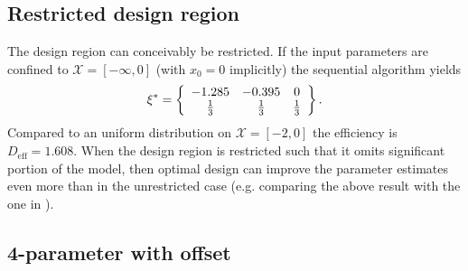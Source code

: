 \documentclass[12pt]{iopart}
\begin{document}
\subsection{Restricted design region}

The design region can conceivably be restricted. If the input parameters are confined to $\mathcal{X} = [-\infty, 0]$ (with $x_0 = 0$ implicitly) the sequential algorithm yields
\begin{equation}
\xi^* = \left\{
  \begin{array}{c c c}
    -1.285 & -0.395 &  0 \\
     \frac{1}{3} & \frac{1}{3} & \frac{1}{3}\\
  \end{array} \right \}.
\end{equation}
Compared to an uniform distribution on $\mathcal{X} = [-2,0]$ the efficiency is $D_\mathrm{eff} = 1.608$. When the design region is restricted such that it omits significant portion of the model, then optimal design can improve the parameter estimates even more than in the unrestricted case (e.g. comparing the above result with the one in ).

\subsection{4-parameter with offset}
\label{sec:4param}
\end{document}
